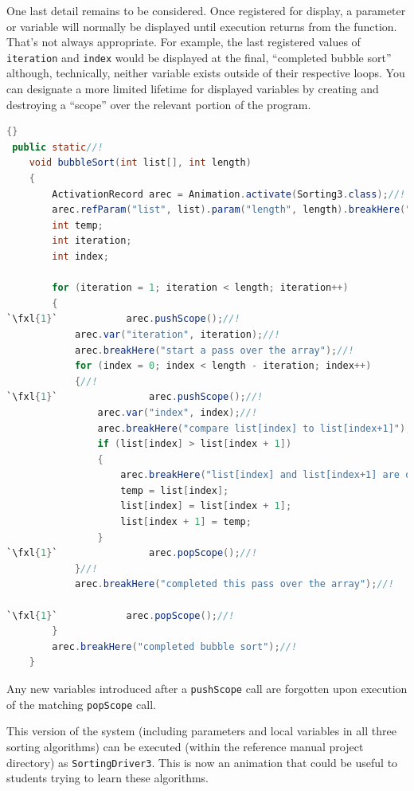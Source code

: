 \documentclass[11pt,titlepage]{book}
\def\fxl#1{%
\newdimen\fxlheight\setlength{\fxlheight}{#1\baselineskip}%
\advance\fxlheight by -0.5\baselineskip%
\begin{picture}(0,0)%
\setlength{\unitlength}{\baselineskip}%
\put(0,0){\makebox(0,0.75)[tl]{%
\colorbox{paleyellow}{%
\rule{0pt}{\fxlheight}%
\rule{\linewidth}{0pt}}%
}}\end{picture}%
}
\begin{document}
One last detail remains to be considered. Once registered for display, a parameter or variable will normally be displayed until execution returns from the function. That's not always appropriate. For example, the last registered values of \texttt{iteration} and \texttt{index} would be displayed at the final, ``completed bubble sort'' although, technically, neither variable exists outside of their respective loops.  You can designate a more limited lifetime for displayed variables by creating and destroying a ``scope'' over the relevant portion of the program. 
\begin{lstlisting}[language=Java,frame=tb]{}
 public static//!
    void bubbleSort(int list[], int length)
    {
        ActivationRecord arec = Animation.activate(Sorting3.class);//!
        arec.refParam("list", list).param("length", length).breakHere("starting bubble sort");//!
        int temp;
        int iteration;
        int index;

        for (iteration = 1; iteration < length; iteration++)
        {
`\fxl{1}`            arec.pushScope();//!
            arec.var("iteration", iteration);//!
            arec.breakHere("start a pass over the array");//!
            for (index = 0; index < length - iteration; index++)
            {//!
`\fxl{1}`                arec.pushScope();//!
                arec.var("index", index);//!
                arec.breakHere("compare list[index] to list[index+1]");//!
                if (list[index] > list[index + 1]) 
                {
                    arec.breakHere("list[index] and list[index+1] are out of order - swap them");//!
                    temp = list[index];
                    list[index] = list[index + 1];
                    list[index + 1] = temp;
                }
`\fxl{1}`                arec.popScope();//!
            }//!
            arec.breakHere("completed this pass over the array");//!

`\fxl{1}`            arec.popScope();//!
        }
        arec.breakHere("completed bubble sort");//!
    }
\end{lstlisting}


Any new variables introduced after a \texttt{pushScope} call are forgotten upon execution of the matching \texttt{popScope} call.



This version of the system (including parameters and local variables
in all three sorting algorithms) can be executed (within the reference
manual project directory) as \texttt{SortingDriver3}. This is now an
animation that could be useful to students trying to learn these
algorithms.
\end{document}

